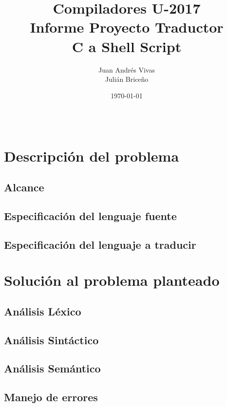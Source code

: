 \documentclass[aspectratio=169]{article}
\title{Compiladores U-2017 \\ Informe Proyecto Traductor \\ C a Shell Script} %
\author{Juan Andr\'es Vivas\\
		Juli\'an Brice\~no} %
\date{\today} %
\begin{document}
\maketitle %

\begin{center}
\begin{tabular}{l r}

\end{tabular}
\end{center}

\newpage

\section{Descripci\'on del problema}

\subsection{Alcance}

\subsection{Especificaci\'on del lenguaje fuente}

\subsection{Especificaci\'on del lenguaje a traducir}

\section{Soluci\'on al problema planteado}

\subsection{An\'alisis L\'exico}

\subsection{An\'alisis Sint\'actico}

\subsection{An\'alisis Sem\'antico}

\subsection{Manejo de errores}
\end{document}
